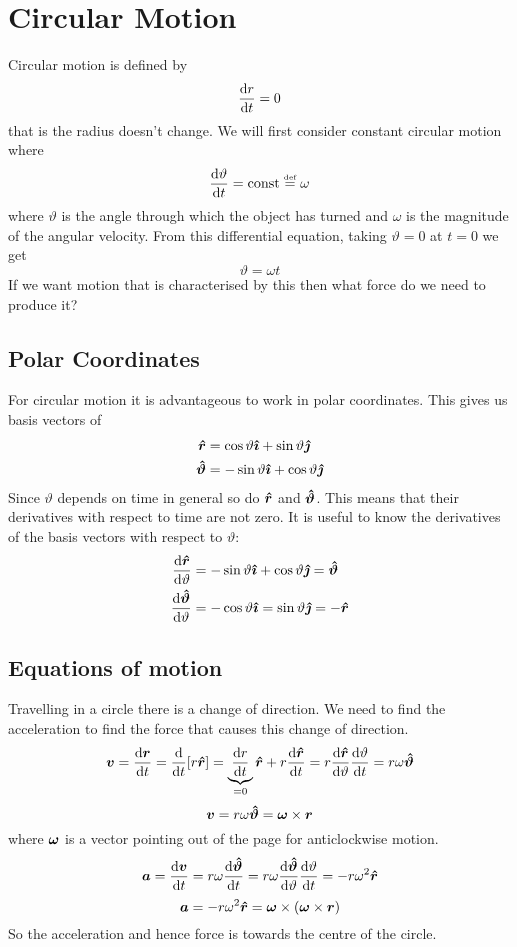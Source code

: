 \documentclass{article}
\newcommand{\defeq}{\overset{\text{\tiny def}}{=}}
\begin{document}
    \section{Circular Motion}
    Circular motion is defined by
    \[\dv{r}{t} = 0\]
    that is the radius doesn't change.
    We will first consider constant circular motion where
    \[\dv{\vartheta}{t} = \text{const} \defeq \omega\]
    where \(\vartheta\) is the angle through which the object has turned and \(\omega\) is the magnitude of the angular velocity.
    From this differential equation, taking \(\vartheta = 0\) at \(t = 0\) we get
    \[\vartheta = \omega t\]
    If we want motion that is characterised by this then what force do we need to produce it?
    
    \subsection{Polar Coordinates}\label{sec:polar unit vector derivatives}
    For circular motion it is advantageous to work in polar coordinates.
    This gives us basis vectors of
    \begin{align*}
        \bm{\hat{r}} &= \cos\vartheta\bm{\hat{\imath}} + \sin\vartheta\bm{\hat{\jmath}}\\
        \bm{\hat{\vartheta}} &= -\sin\vartheta\bm{\hat{\imath}} + \cos\vartheta\bm{\hat{\jmath}}
    \end{align*}
    Since \(\vartheta\) depends on time in general so do \(\bm{\hat{r}}\) and \(\bm{\hat{\vartheta}}\).
    This means that their derivatives with respect to time are not zero.
    It is useful to know the derivatives of the basis vectors with respect to \(\vartheta\):
    \begin{align*}
        \dv{\bm{\hat{r}}}{\vartheta} &= -\sin\vartheta\bm{\hat{\imath}} + \cos\vartheta\bm{\hat{\jmath}} = \bm{\hat{\vartheta}}\\
        \dv{\bm{\hat{\vartheta}}}{\vartheta} &= -\cos\vartheta\bm{\hat{\imath}} = \sin\vartheta\bm{\hat{\jmath}} = -\bm{\hat{r}}
    \end{align*}
    
    \subsection{Equations of motion}
    Travelling in a circle there is a change of direction.
    We need to find the acceleration to find the force that causes this change of direction.
    \[\bm{v} = \dv{\bm{r}}{t} = \dv{t}[r\bm{\hat{r}}] = \underbrace{\dv{r}{t}}_{=0} \bm{\hat{r}} + r\dv{\bm{\hat{r}}}{t} = r\dv{\bm{\hat{r}}}{\vartheta}\dv{\vartheta}{t} = r\omega\bm{\hat{\vartheta}}\]
    \[\bm{v} = r\omega\bm{\hat{\vartheta}} = \bm{\omega} \times \bm{r}\]
    where \(\bm{\omega}\) is a vector pointing out of the page for anticlockwise motion.
    \[\bm{a} = \dv{\bm{v}}{t} = r\omega\dv{\bm{\hat{\vartheta}}}{t} = r\omega\dv{\bm{\hat{\vartheta}}}{\vartheta}\dv{\vartheta}{t} = -r\omega^2\bm{\hat{r}}\]
    \[\bm{a} = -r\omega^2\bm{\hat{r}} = \bm{\omega} \times (\bm{\omega} \times \bm{r})\]
    So the acceleration and hence force is towards the centre of the circle.
    
\end{document}
